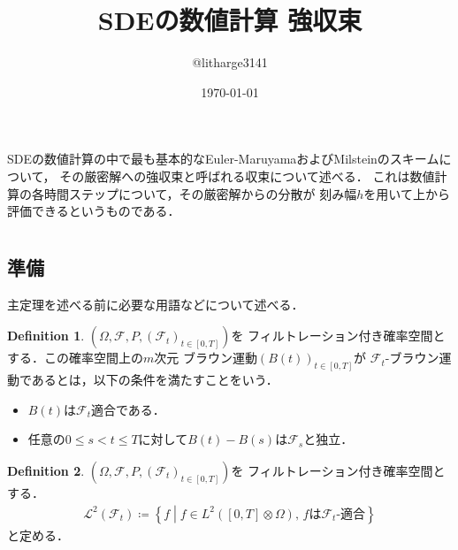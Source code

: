\documentclass[dvipdfmx,autodetect-engine]{jsarticle}
\theoremstyle{remark}
\theoremstyle{definition}
\newtheorem{definition}{Definition}[section]
\newcommand{\setmid}{\mathrel{} \middle| \mathrel{}}
\begin{document}
\title{SDEの数値計算 強収束}
\author{@litharge3141}
\date{\today}
\maketitle

\abstract{}
SDEの数値計算の中で最も基本的なEuler-MaruyamaおよびMilsteinのスキームについて，
その厳密解への強収束と呼ばれる収束について述べる．
これは数値計算の各時間ステップについて，その厳密解からの分散が
刻み幅$h$を用いて上から評価できるというものである．

\section{}

\subsection{準備}
主定理を述べる前に必要な用語などについて述べる．


\begin{definition}
    $(\Omega,\mathcal{F},P,(\mathcal{F}_{t})_{t \in [0,T]})$を
    フィルトレーション付き確率空間とする．この確率空間上の$m$次元
    ブラウン運動$(B(t))_{t \in [0,T]}$が
    $\mathcal{F}_t$-ブラウン運動であるとは，以下の条件を満たすことをいう．
    \begin{itemize}
        \item $B(t)$は$\mathcal{F}_{t}$適合である．
        \item 任意の$0\leq s < t\leq T$に対して$B(t)-B(s)$は$\mathcal{F}_{s}$と独立．
    \end{itemize}
\end{definition}


\begin{definition}
    $(\Omega,\mathcal{F},P,(\mathcal{F}_{t})_{t \in [0,T]})$を
    フィルトレーション付き確率空間とする．
    \begin{align}
        \mathcal{L}^{2}(\mathcal{F}_{t}) \coloneqq
        \left\{f \setmid f \in L^{2}([0,T]\otimes \Omega),\,
        f \text{は}\mathcal{F}_{t}\text{-適合} \right\}
    \end{align}
    と定める．
\end{definition}
\end{document}
